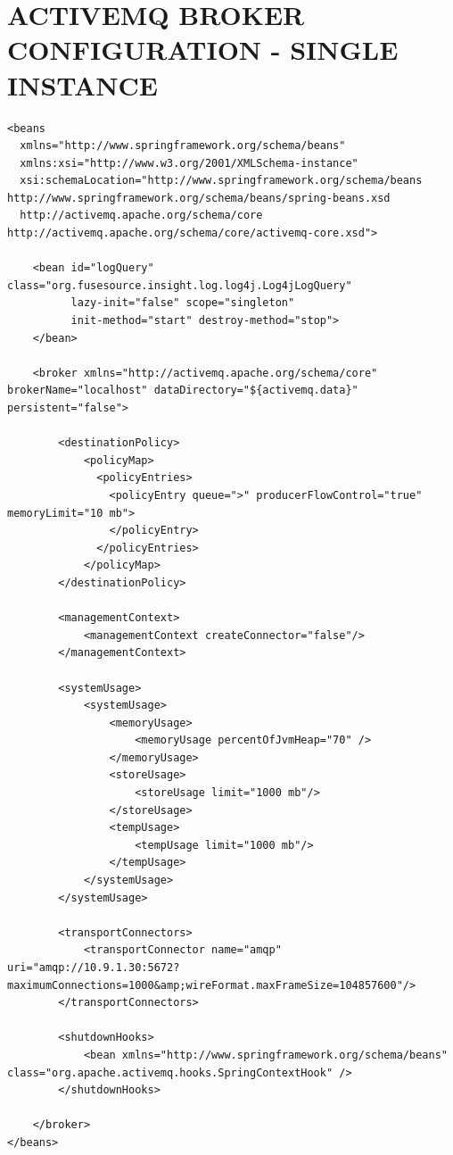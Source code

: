 \documentclass{thesis}
\begin{document}
\chapter{ACTIVEMQ BROKER CONFIGURATION - SINGLE INSTANCE}
\begin{lstlisting}
<beans
  xmlns="http://www.springframework.org/schema/beans"
  xmlns:xsi="http://www.w3.org/2001/XMLSchema-instance"
  xsi:schemaLocation="http://www.springframework.org/schema/beans http://www.springframework.org/schema/beans/spring-beans.xsd
  http://activemq.apache.org/schema/core http://activemq.apache.org/schema/core/activemq-core.xsd">

    <bean id="logQuery" class="org.fusesource.insight.log.log4j.Log4jLogQuery"
          lazy-init="false" scope="singleton"
          init-method="start" destroy-method="stop">
    </bean>

    <broker xmlns="http://activemq.apache.org/schema/core" brokerName="localhost" dataDirectory="${activemq.data}" persistent="false">

        <destinationPolicy>
            <policyMap>
              <policyEntries>
                <policyEntry queue=">" producerFlowControl="true" memoryLimit="10 mb">   
                </policyEntry>
              </policyEntries>
            </policyMap>
        </destinationPolicy>

        <managementContext>
            <managementContext createConnector="false"/>
        </managementContext>

        <systemUsage>
            <systemUsage>
                <memoryUsage>
                    <memoryUsage percentOfJvmHeap="70" />
                </memoryUsage>
                <storeUsage>
                    <storeUsage limit="1000 mb"/>
                </storeUsage>
                <tempUsage>
                    <tempUsage limit="1000 mb"/>
                </tempUsage>
            </systemUsage>
        </systemUsage>

        <transportConnectors>
            <transportConnector name="amqp" uri="amqp://10.9.1.30:5672?maximumConnections=1000&amp;wireFormat.maxFrameSize=104857600"/>
        </transportConnectors>

        <shutdownHooks>
            <bean xmlns="http://www.springframework.org/schema/beans" class="org.apache.activemq.hooks.SpringContextHook" />
        </shutdownHooks>

    </broker>
</beans>
\end{lstlisting}
\end{document}
